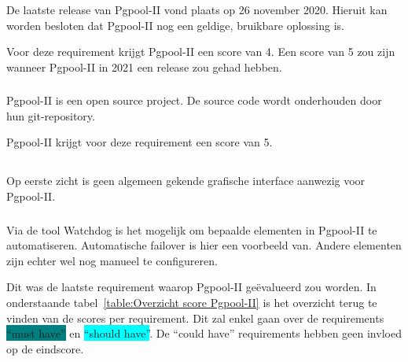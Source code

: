 De laatste release van Pgpool-II vond plaats op 26 november 2020. Hieruit kan worden besloten dat Pgpool-II nog een geldige, bruikbare oplossing is.

Voor deze requirement krijgt Pgpool-II een score van 4. Een score van 5 zou zijn wanneer Pgpool-II in 2021 een release zou gehad hebben.

\subsubsection{}
\label{subsubsec:Open source}

Pgpool-II is een open source project. De source code wordt onderhouden door hun git-repository.

Pgpool-II krijgt voor deze requirement een score van 5.

\subsection{}
\label{subsec:Could have}


\subsubsection{}
\label{subsubsec:Grafische interface}

Op eerste zicht is geen algemeen gekende grafische interface aanwezig voor Pgpool-II.

\subsubsection{}
\label{subsubsec:Beperkte manuele interventie}

Via de tool Watchdog is het mogelijk om bepaalde elementen in Pgpool-II te automatiseren. Automatische failover is hier een voorbeeld van. Andere elementen zijn echter wel nog manueel te configureren.


Dit was de laatste requirement waarop Pgpool-II geëvalueerd zou worden. In onderstaande tabel~\ref{table:Overzicht score Pgpool-II} is het overzicht terug te vinden van de scores per requirement. Dit zal enkel gaan over de requirements \colorbox{teal}{“must have”} en \colorbox{cyan}{“should have”}. De “could have” requirements hebben geen invloed op de eindscore.

